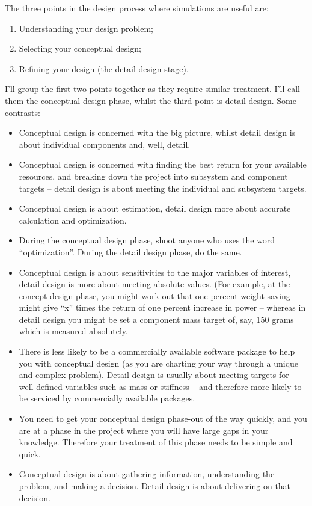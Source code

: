 \documentclass[10pt, a4paper, article, oneside, twocolumn, final]{memoir}
\begin{document}
The three points in the design process where simulations are useful are: 

\begin{enumerate}
    \item Understanding your design problem; 
    \item Selecting your conceptual design; 
    \item Refining your design (the detail design stage).
\end{enumerate}

I’ll group the first two points together as they require similar treatment. I’ll call them the conceptual design phase, whilst the third point is detail design. Some contrasts: 

\begin{itemize}
    \item Conceptual design is concerned with the big picture, whilst detail design is about individual components and, well, detail.
    \item Conceptual design is concerned with finding the best return for your available resources, and breaking down the project into subsystem and component targets -- detail design is about meeting the individual and subsystem targets. 
    \item Conceptual design is about estimation, detail design more about accurate calculation and optimization.
    \item During the conceptual design phase, shoot anyone who uses the word “optimization”. During the detail design phase, do the same.
    \item Conceptual design is about sensitivities to the major variables of interest, detail design is more about meeting absolute values. (For example, at the concept design phase, you might work out that one percent weight saving might give “x” times the return of one percent increase in power -- whereas in detail design you might be set a component mass target of, say, \num{150} grams which is measured absolutely. 
    \item There is less likely to be a commercially available software package to help you with conceptual design (as you are charting your way through a unique and complex problem). Detail design is usually about meeting targets for well-defined variables such as mass or stiffness -- and therefore more likely to be serviced by commercially available packages.
    \item You need to get your conceptual design phase-out of the way quickly, and you are at a phase in the project where you will have large gaps in your knowledge. Therefore your treatment of this phase needs to be simple and quick. 
    \item Conceptual design is about gathering information, understanding the problem, and making a decision. Detail design is about delivering on that decision.
\end{itemize}
\end{document}
